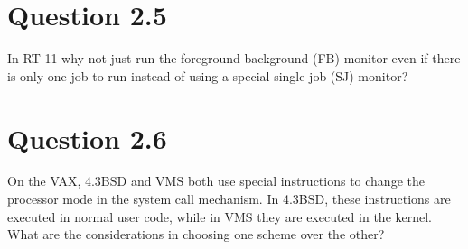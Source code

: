 \documentclass{article}
\begin{document}
\section*{Question 2.5}
In RT-11 why not just run the foreground-background (FB) monitor even if there is only one job to run instead of using a special single job (SJ) monitor?
\section*{Question 2.6}
On the VAX, 4.3BSD and VMS both use special instructions to change the processor mode in the system call mechanism. In 4.3BSD, these instructions are executed in normal user code, while in VMS they are executed in the kernel. What are the considerations in choosing one scheme over the other?
\end{document}
